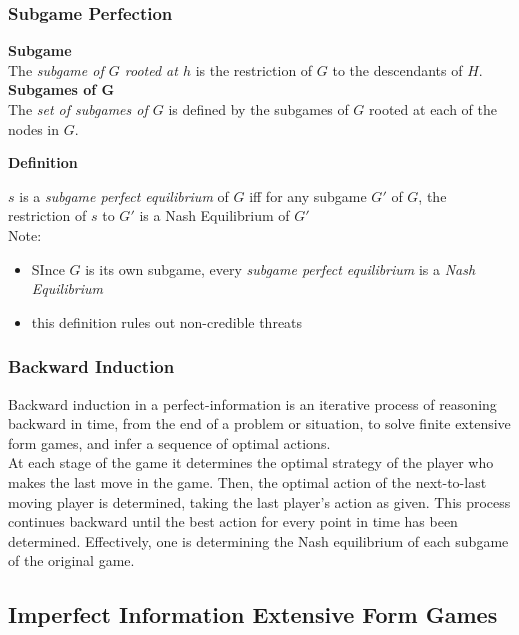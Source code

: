 \subsubsection{Subgame Perfection}

\textbf{Subgame}\\
The \textit{subgame of $G$ rooted at $h$} is the restriction of $G$ to the descendants of $H$.\\
\textbf{Subgames of G}\\
The \textit{set of subgames of $G$} is defined by the subgames of $G$ rooted at each of the nodes in $G$.

\begin{flushleft}
\textbf{Definition}
\end{flushleft}
$s$ is a \textit{subgame perfect equilibrium} of $G$ iff for any subgame $G'$ of $G$, the restriction of $s$ to $G'$ is a Nash Equilibrium of $G'$\\

Note:
\begin{itemize}
\item SInce $G$ is its own subgame, every \textit{subgame perfect equilibrium} is a \textit{Nash Equilibrium}
\item this definition rules out non-credible threats
\end{itemize}

\subsubsection{Backward Induction}

Backward induction in a perfect-information is an iterative process of reasoning backward in time, from the end of a problem or situation, to solve finite extensive form games, and infer a sequence of optimal actions.\\

At each stage of the game it determines the optimal strategy of the player who makes the last move in the game. Then, the optimal action of the next-to-last moving player is determined, taking the last player's action as given. This process continues backward until the best action for every point in time has been determined. Effectively, one is determining the Nash equilibrium of each subgame of the original game.

\subsection{Imperfect Information Extensive Form Games}

